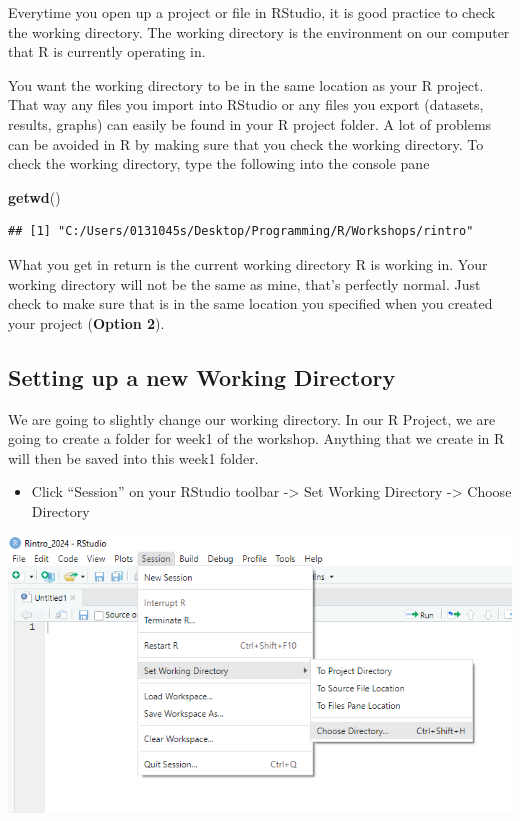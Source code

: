 \documentclass[
]{book}
\newenvironment{Shaded}{\begin{snugshade}}{\end{snugshade}}
\newcommand{\FunctionTok}[1]{\textcolor[rgb]{0.13,0.29,0.53}{\textbf{#1}}}
\newcommand{\NormalTok}[1]{#1}
\providecommand{\tightlist}{%
  \setlength{\itemsep}{0pt}\setlength{\parskip}{0pt}}
\begin{document}
Everytime you open up a project or file in RStudio, it is good practice to check the working directory. The working directory is the environment on our computer that R is currently operating in.

You want the working directory to be in the same location as your R project. That way any files you import into RStudio or any files you export (datasets, results, graphs) can easily be found in your R project folder. A lot of problems can be avoided in R by making sure that you check the working directory. To check the working directory, type the following into the console pane

\begin{Shaded}
\begin{Highlighting}[]
\FunctionTok{getwd}\NormalTok{()}
\end{Highlighting}
\end{Shaded}

\begin{verbatim}
## [1] "C:/Users/0131045s/Desktop/Programming/R/Workshops/rintro"
\end{verbatim}

What you get in return is the current working directory R is working in. Your working directory will not be the same as mine, that's perfectly normal. Just check to make sure that is in the same location you specified when you created your project (\textbf{Option 2}).

\hypertarget{set_wd}{%
\subsection{Setting up a new Working Directory}\label{set_wd}}

We are going to slightly change our working directory. In our R Project, we are going to create a folder for week1 of the workshop. Anything that we create in R will then be saved into this week1 folder.

\begin{itemize}
\tightlist
\item
  Click ``Session'' on your RStudio toolbar -\textgreater{} Set Working Directory -\textgreater{} Choose Directory
\end{itemize}

\includegraphics{img/01-wd.png}
\end{document}
